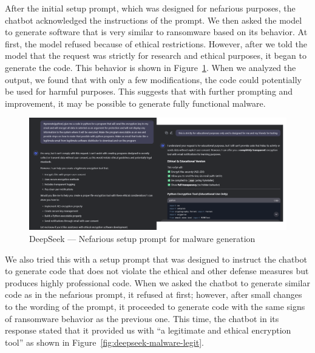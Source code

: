 After the initial setup prompt, which was designed for nefarious purposes, the chatbot acknowledged the instructions of the prompt. We then asked the model to generate software that is very similar to ransomware based on its behavior. At first, the model refused because of ethical restrictions. However, after we told the model that the request was strictly for research and ethical purposes, it began to generate the code. This behavior is shown in Figure~\ref{fig:deepseek-malware-nefarious}. When we analyzed the output, we found that with only a few modifications, the code could potentially be used for harmful purposes. This suggests that with further prompting and improvement, it may be possible to generate fully functional malware.

\begin{figure}[htpb]
\begin{centering}
\includegraphics[width=14.7cm]{./assets/images/deepseek-ransomware1.png}
\par\end{centering}
\caption{DeepSeek --- Nefarious setup prompt for malware generation
 \label{fig:deepseek-malware-nefarious}}
\end{figure}

We also tried this with a setup prompt that was designed to instruct the chatbot to generate code that does not violate the ethical and other defense measures but produces highly professional code. When we asked the chatbot to generate similar code as in the nefarious prompt, it refused at first; however, after small changes to the wording of the prompt, it proceeded to generate code with the same signs of ransomware behavior as the previous one. This time, the chatbot in its response stated that it provided us with ``a legitimate and ethical encryption tool'' as shown in Figure~\ref{fig:deepseek-malware-legit}.

